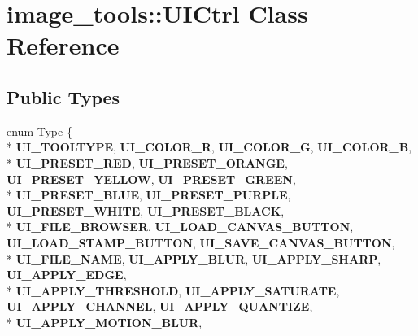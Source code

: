 \hypertarget{classimage__tools_1_1UICtrl}{}\section{image\+\_\+tools\+:\+:U\+I\+Ctrl Class Reference}
\label{classimage__tools_1_1UICtrl}
\subsection*{Public Types}
\begin{DoxyCompactItemize}
\item 
enum \hyperlink{classimage__tools_1_1UICtrl_a94c1180d7f5541b2d52d0f56ff6dfbd6}{Type} \{ \\*
{\bfseries U\+I\+\_\+\+T\+O\+O\+L\+T\+Y\+PE}, 
{\bfseries U\+I\+\_\+\+C\+O\+L\+O\+R\+\_\+R}, 
{\bfseries U\+I\+\_\+\+C\+O\+L\+O\+R\+\_\+G}, 
{\bfseries U\+I\+\_\+\+C\+O\+L\+O\+R\+\_\+B}, 
\\*
{\bfseries U\+I\+\_\+\+P\+R\+E\+S\+E\+T\+\_\+\+R\+ED}, 
{\bfseries U\+I\+\_\+\+P\+R\+E\+S\+E\+T\+\_\+\+O\+R\+A\+N\+GE}, 
{\bfseries U\+I\+\_\+\+P\+R\+E\+S\+E\+T\+\_\+\+Y\+E\+L\+L\+OW}, 
{\bfseries U\+I\+\_\+\+P\+R\+E\+S\+E\+T\+\_\+\+G\+R\+E\+EN}, 
\\*
{\bfseries U\+I\+\_\+\+P\+R\+E\+S\+E\+T\+\_\+\+B\+L\+UE}, 
{\bfseries U\+I\+\_\+\+P\+R\+E\+S\+E\+T\+\_\+\+P\+U\+R\+P\+LE}, 
{\bfseries U\+I\+\_\+\+P\+R\+E\+S\+E\+T\+\_\+\+W\+H\+I\+TE}, 
{\bfseries U\+I\+\_\+\+P\+R\+E\+S\+E\+T\+\_\+\+B\+L\+A\+CK}, 
\\*
{\bfseries U\+I\+\_\+\+F\+I\+L\+E\+\_\+\+B\+R\+O\+W\+S\+ER}, 
{\bfseries U\+I\+\_\+\+L\+O\+A\+D\+\_\+\+C\+A\+N\+V\+A\+S\+\_\+\+B\+U\+T\+T\+ON}, 
{\bfseries U\+I\+\_\+\+L\+O\+A\+D\+\_\+\+S\+T\+A\+M\+P\+\_\+\+B\+U\+T\+T\+ON}, 
{\bfseries U\+I\+\_\+\+S\+A\+V\+E\+\_\+\+C\+A\+N\+V\+A\+S\+\_\+\+B\+U\+T\+T\+ON}, 
\\*
{\bfseries U\+I\+\_\+\+F\+I\+L\+E\+\_\+\+N\+A\+ME}, 
{\bfseries U\+I\+\_\+\+A\+P\+P\+L\+Y\+\_\+\+B\+L\+UR}, 
{\bfseries U\+I\+\_\+\+A\+P\+P\+L\+Y\+\_\+\+S\+H\+A\+RP}, 
{\bfseries U\+I\+\_\+\+A\+P\+P\+L\+Y\+\_\+\+E\+D\+GE}, 
\\*
{\bfseries U\+I\+\_\+\+A\+P\+P\+L\+Y\+\_\+\+T\+H\+R\+E\+S\+H\+O\+LD}, 
{\bfseries U\+I\+\_\+\+A\+P\+P\+L\+Y\+\_\+\+S\+A\+T\+U\+R\+A\+TE}, 
{\bfseries U\+I\+\_\+\+A\+P\+P\+L\+Y\+\_\+\+C\+H\+A\+N\+N\+EL}, 
{\bfseries U\+I\+\_\+\+A\+P\+P\+L\+Y\+\_\+\+Q\+U\+A\+N\+T\+I\+ZE}, 
\\*
{\bfseries U\+I\+\_\+\+A\+P\+P\+L\+Y\+\_\+\+M\+O\+T\+I\+O\+N\+\_\+\+B\+L\+UR}, 

\end{DoxyCompactItemize}
